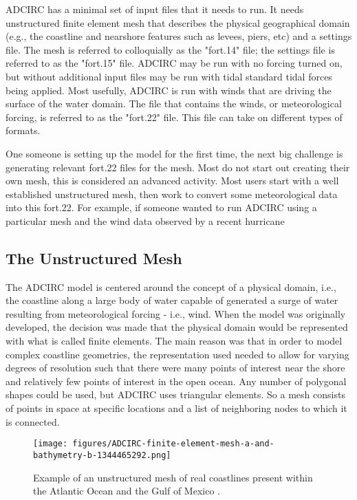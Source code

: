 \documentclass{article}
\begin{document}
ADCIRC has a minimal set of input files that it needs to run. It needs
unstructured finite element mesh that describes the physical geographical domain
(e.g., the coastline and nearshore features such as levees, piers, etc) and a
settings file. The mesh is referred to colloquially as the "fort.14" file; the
settings file is referred to as the "fort.15" file. ADCIRC may be run with no
forcing turned on, but without additional input files may be run with tidal
standard tidal forces being applied. Most usefully, ADCIRC is run with winds
that are driving the surface of the water domain. The file that contains the
winds, or meteorological forcing, is referred to as the "fort.22" file. This
file can take on different types of formats.

One someone is setting up the model for the first time, the next big challenge
is generating relevant fort.22 files for the mesh. Most do not start out
creating their own mesh, this is considered an advanced activity. Most users
start with a well established unstructured mesh, then work to convert some
meteorological data into this fort.22. For example, if someone wanted to run
ADCIRC using a particular mesh and the wind data observed by a recent hurricane

\subsection{The Unstructured Mesh}

The ADCIRC model is centered around the concept of a physical domain, i.e., the
coastline along a large body of water capable of generated a surge of water
resulting from meteorological forcing - i.e., wind. When the model was
originally developed, the decision was made that the physical domain would be
represented with what is called finite elements.  The main reason was that in
order to model complex coastline geometries, the representation used needed to
allow for varying degrees of resolution such that there were many points of
interest near the shore and relatively few points of interest in the open ocean.
Any number of polygonal shapes could be used, but ADCIRC uses triangular
elements. So a mesh consists of points in space at specific locations and a list
of neighboring nodes to which it is connected.

\begin{figure}
\centering
\texttt{[image: figures/ADCIRC-finite-element-mesh-a-and-bathymetry-b-1344465292.png]}
\caption{\label{fig:mesh}Example of an unstructured mesh of real coastlines present within the Atlantic Ocean
and the Gulf of Mexico \cite{Warnock17}.}
\end{figure}
\end{document}
